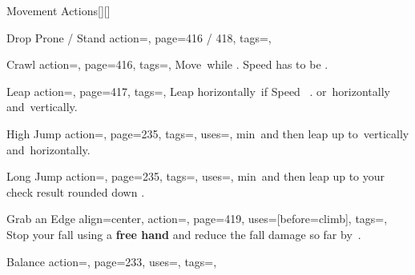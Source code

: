 \begin{PageBack}
\begin{Tables}{\backTableHeight}
\begin{Table}{Movement Actions}[][]
\begin{entry}{Drop Prone / Stand}{%
                action=,
                page=416 / 418,
                tags=\Move,
            }
            \end{entry}
            \begin{entry}{Crawl}{%
                action=,
                page=416,
                tags=\Move,
            }
                Move \,\Feet while \Prone. Speed has to be .
            \end{entry}
            \breakLine
            \begin{entry}{Leap}{%
                action=,
                page=417,
                tags=\Move,
            }
                Leap horizontally
                \,\Feet if Speed \,\Feet
                .\hfill
                or \,\Feet horizontally and \,\Feet vertically.
            \end{entry}
            \begin{entry}{High Jump}{%
                action=,
                page=235,
                tags=\Move,
                uses={\Athletics[][val=30]},
            }
                 min \,\Feet and then leap up to \,\Feet vertically
                and \,\Feet horizontally.\hfill
            \end{entry}
            \begin{entry}{Long Jump}{%
                action=,
                page=235,
                tags=\Move,
                uses={\Athletics[][val=15]},
            }
                 min \,\Feet and then leap up to your check result rounded down .
                \hfill
                \; 
            \end{entry}
            \begin{entry}{Grab an Edge}{%
                align=center,
                action=,
                page=419,
                uses={[before=climb]},
                tags=\Manipulate,
            }
                Stop your fall using a \textbf{ free hand} and reduce the fall damage so far by 
                \,\Feet.\\\hfill
            \end{entry}
            \breakLine
            \begin{entry}{Balance}{%
                action=,
                page=233,
                uses=\Acrobatics,
                tags=\Move,
            }

\end{entry}
\end{Table}
\end{Tables}
\end{PageBack}
